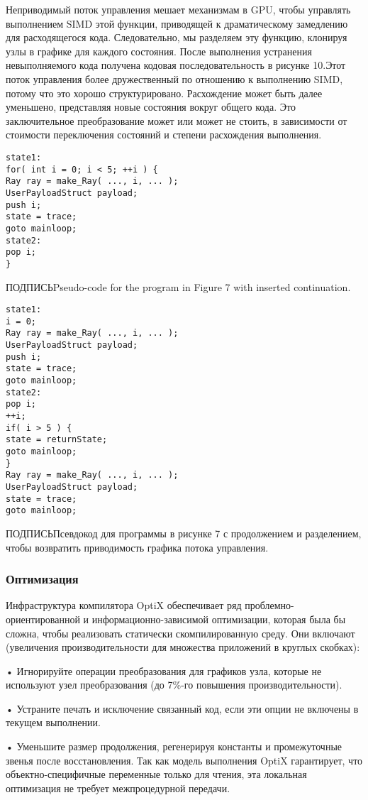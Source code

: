 Неприводимый поток управления мешает механизмам в GPU, чтобы управлять выполнением SIMD этой функции, приводящей к драматическому замедлению для расходящегося кода. Следовательно, мы разделяем эту функцию, клонируя узлы в графике для каждого состояния. После выполнения устранения невыполняемого кода получена кодовая последовательность в рисунке 10.Этот поток управления более дружественный по отношению к выполнению SIMD, потому что это хорошо структурировано. Расхождение может быть далее уменьшено, представляя новые состояния вокруг общего кода. Это заключительное преобразование может или может не стоить, в зависимости от стоимости переключения состояний и степени расхождения выполнения.
\begin{verbatim}
state1:
for( int i = 0; i < 5; ++i ) {
Ray ray = make_Ray( ..., i, ... );
UserPayloadStruct payload;
push i;
state = trace;
goto mainloop;
state2:
pop i;
}
\end{verbatim}
ПОДПИСЬPseudo-code for the program in Figure 7 with inserted continuation.
\begin{verbatim}
state1:
i = 0;
Ray ray = make_Ray( ..., i, ... );
UserPayloadStruct payload;
push i;
state = trace;
goto mainloop;
state2:
pop i;
++i;
if( i > 5 ) {
state = returnState;
goto mainloop;
}
Ray ray = make_Ray( ..., i, ... );
UserPayloadStruct payload;
state = trace;
goto mainloop;
\end{verbatim}
ПОДПИСЬПсевдокод для программы в рисунке 7 с продолжением и разделением, чтобы возвратить приводимость графика потока управления.

\subsubsection{Оптимизация}
Инфраструктура компилятора OptiX обеспечивает ряд проблемно-ориентированной и информационно-зависимой оптимизации, которая была бы сложна, чтобы реализовать статически скомпилированную среду. Они включают (увеличения производительности для множества приложений в круглых скобках):

• Игнорируйте операции преобразования для графиков узла, которые не используют узел преобразования (до 7\%-го повышения производительности).

• Устраните печать и исключение связанный код, если эти опции не включены в текущем выполнении.

• Уменьшите размер продолжения, регенерируя константы и промежуточные звенья после восстановления. Так как модель выполнения OptiX гарантирует, что объектно-специфичные переменные только для чтения, эта локальная оптимизация не требует межпроцедурной передачи.

